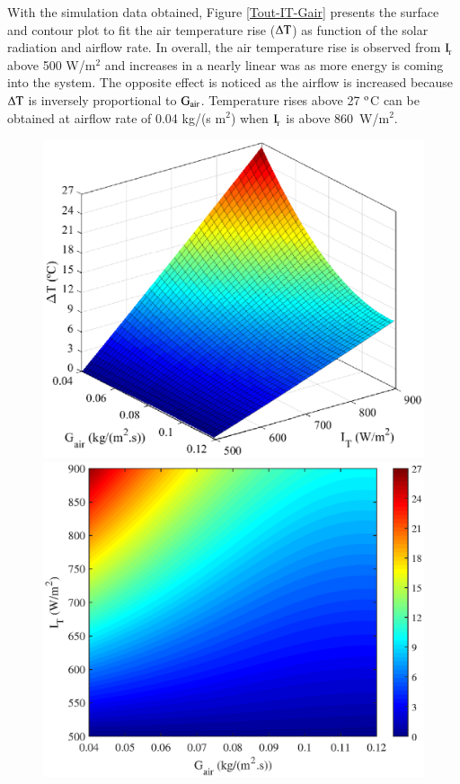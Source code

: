 With the simulation data obtained, Figure \ref{Tout-IT-Gair} presents the surface and contour plot to fit the air temperature rise ($\Delta \rm{T}$) as function of the solar radiation and airflow rate. In overall, the air temperature rise is observed from $\rm{I_{\!_T}}$ above 500 W/m$^2$ and increases in a nearly linear was as more energy is coming into the system. The opposite effect is noticed as the airflow is increased because $\Delta \rm{T}$ is inversely proportional to $\rm{G_{air}}$. Temperature rises above 27 $^{\rm{o}}$C can be obtained at airflow rate of 0.04 kg/(s m$^2$) when $\rm{I_{\!_T}}$ is above \mbox{860 W/m$^2$}.

\begin{figure}[ht!]
	\begin{minipage}{0.49\columnwidth}
		\includegraphics[scale=0.49]{figs/Tout_x_GT_Gair.eps}
	\end{minipage}
	\begin{minipage}{0.49\columnwidth}
		\includegraphics[scale=0.49]{figs/contour_dT.eps}

\end{minipage}
\end{figure}
